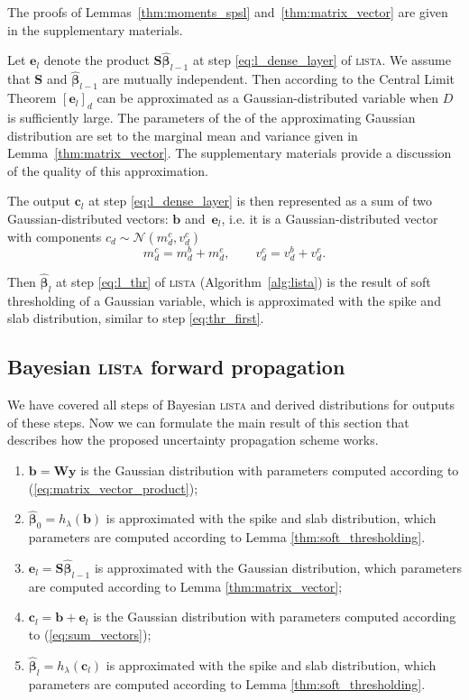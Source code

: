 \documentclass{article}
\begin{document}
  The proofs of Lemmas~\ref{thm:moments_spsl} and~\ref{thm:matrix_vector} are given in the supplementary materials.
  
  Let $\mathbf{e}_l$ denote the product $\mathbf{S}\widehat{\boldsymbol\beta}_{l-1}$ at step \ref{eq:l_dense_layer} of \textsc{lista}. We assume that $\mathbf{S}$ and $\widehat{\boldsymbol\beta}_{l-1}$ are mutually independent. Then according to the Central Limit Theorem $[ \mathbf{e}_l ]_d$ can be approximated as a Gaussian-distributed variable when $D$ is sufficiently large. The parameters of the of the approximating Gaussian distribution are set to the marginal mean and variance given in Lemma~\ref{thm:matrix_vector}. The supplementary materials provide a discussion of the quality of this approximation.
  
  The output $\mathbf{c}_l$ at step \ref{eq:l_dense_layer} is then represented as a sum of two Gaussian-distributed vectors: $\mathbf{b}$ and~$\mathbf{e}_l$, i.e. it is a Gaussian-distributed vector with components $c_{d} \sim \mathcal{N}(m^c_{d}, v^c_{d})$
  \begin{equation}
  \label{eq:sum_vectors}
  m^c_{d} = m^b_{d} + m^e_{d}, \qquad
  v^c_{d} = v^b_{d} + v^e_{d}.
  \end{equation}
  
  
  Then $\widehat{\boldsymbol\beta}_{l}$ at step \ref{eq:l_thr} of \textsc{lista} (Algorithm~\ref{alg:lista}) is the result of soft thresholding of a Gaussian variable, which is approximated with the spike and slab distribution,  similar to step \ref{eq:thr_first}.
  
  \subsection{Bayesian \textsc{lista} forward propagation}
  We have covered all steps of Bayesian \textsc{lista} and derived distributions for outputs of these steps. Now we can formulate the main result of this section that describes how the proposed uncertainty propagation scheme works.
  
  \begin{enumerate}
    \item $\mathbf{b} = \mathbf{W}\mathbf{y}$ is the Gaussian distribution with parameters computed according to (\ref{eq:matrix_vector_product});
    \item $\widehat{\boldsymbol\beta}_{0} = h_\lambda(\mathbf{b})$ is approximated with the spike and slab distribution, which parameters are computed according to Lemma \ref{thm:soft_thresholding}.
    \item $\mathbf{e}_l = \mathbf{S}\widehat{\boldsymbol\beta}_{l-1}$ is approximated with the Gaussian distribution, which parameters are computed according to Lemma \ref{thm:matrix_vector};
    \item $\mathbf{c}_l = \mathbf{b} + \mathbf{e}_l$ is the Gaussian distribution with parameters computed according to (\ref{eq:sum_vectors});
    \item $\widehat{\boldsymbol\beta}_{l} = h_\lambda(\mathbf{c}_l)$ is approximated with the spike and slab distribution, which parameters are computed according to Lemma \ref{thm:soft_thresholding}.
  \end{enumerate}
  
\end{document}
